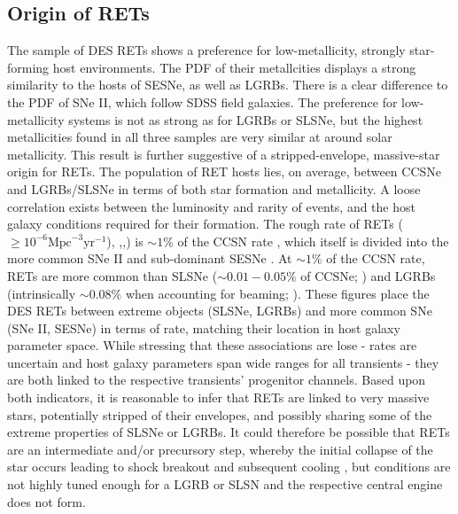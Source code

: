 \documentclass[fleqn,usenatbib,]{mnras}
\newcommand{\replychris}[1]{\color{magenta}#1 \color{black}}
\begin{document}
\subsection{Origin of RETs \label{subsec:disc_origin}}

The sample of DES RETs shows a preference for low-metallicity, strongly star-forming host environments. The PDF of their metallcities displays a strong similarity to the hosts of SESNe, as well as LGRBs. There is a clear difference to the PDF of SNe II, which follow SDSS field galaxies. The preference for low-metallicity systems is not as strong as for LGRBs or SLSNe, but the highest metallicities found in all three samples are very similar at around solar metallicity. This result is further suggestive of a stripped-envelope, massive-star origin for RETs. 
The population of RET hosts lies, on average, between CCSNe and LGRBs/SLSNe in terms of both star formation and metallicity. A loose correlation exists between the luminosity and rarity of events, and the host galaxy conditions required for their formation. The rough rate of RETs ($\geq 10^{-6} \mathrm{Mpc}^{-3} \mathrm{yr}^{-1}$), \citealt{Drout2014},,\citealt{Tampo2020}) is $\sim1\%$ of the CCSN rate \citep{Li2011,Horiuchi2011,Strolger2015}, which itself is divided into the more common SNe II and sub-dominant SESNe \citep{Kelly2012,Frohmaier2020}. At $\sim1\%$ of the CCSN rate, RETs are more common than SLSNe ($\sim0.01 - 0.05\%$ of CCSNe; \citealt{McCrum2015,Prajs2017,Frohmaier2020}) and LGRBs (intrinsically $\sim0.08\%$ when accounting for beaming; \citealt{Graham2016}). These figures place the DES RETs between extreme objects (SLSNe, LGRBs) and more common SNe (SNe II, SESNe) in terms of rate, matching their location in host galaxy parameter space. While stressing that these associations are lose - rates are uncertain and host galaxy parameters span wide ranges for all transients - they are both linked to the respective transients' progenitor channels. Based upon both indicators, it is reasonable to infer that RETs are linked to very massive stars, \replychris{potentially stripped of their envelopes, and possibly sharing some of the extreme properties of} SLSNe or LGRBs. It could therefore be possible that RETs are an intermediate and/or precursory step, whereby the initial collapse of the star occurs leading to \replychris{shock breakout and subsequent cooling}, but conditions are not highly tuned enough for a LGRB or SLSN and the respective central engine does not form. 
\end{document}
